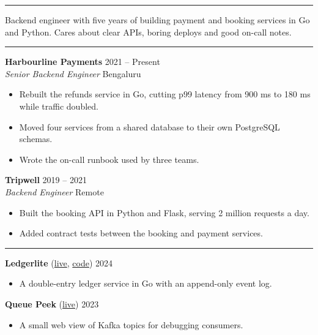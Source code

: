 \documentclass[10pt]{article}
\newcommand{\mainhead}[1]{\vspace{8pt}{\large\bfseries #1}\par\vspace{-5pt}\rule{\linewidth}{0.6pt}\par\vspace{3pt}}
\begin{document}
\begin{minipage}[t]{0.65\textwidth}
\mainhead{Summary}
Backend engineer with five years of building payment and booking services in Go
and Python. Cares about clear APIs, boring deploys and good on-call notes.

\mainhead{Experience}
\textbf{Harbourline Payments} \hfill 2021 -- Present\\
\textit{Senior Backend Engineer} \hfill Bengaluru
\begin{itemize}
\item Rebuilt the refunds service in Go, cutting p99 latency from 900 ms to 180 ms
  while traffic doubled.
\item Moved four services from a shared database to their own PostgreSQL schemas.
\item Wrote the on-call runbook used by three teams.
\end{itemize}
\vspace{4pt}
\textbf{Tripwell} \hfill 2019 -- 2021\\
\textit{Backend Engineer} \hfill Remote
\begin{itemize}
\item Built the booking API in Python and Flask, serving 2 million requests a day.
\item Added contract tests between the booking and payment services.
\end{itemize}

\mainhead{Projects}
\textbf{Ledgerlite} (\href{https://ledgerlite.example.com}{live},
\href{https://github.com/sara-f-example/ledgerlite}{code}) \hfill 2024
\begin{itemize}
\item A double-entry ledger service in Go with an append-only event log.
\end{itemize}
\vspace{4pt}
\textbf{Queue Peek} (\href{https://queuepeek.example.org}{live}) \hfill 2023
\begin{itemize}
\item A small web view of Kafka topics for debugging consumers.
\end{itemize}
\end{minipage}
\end{document}
